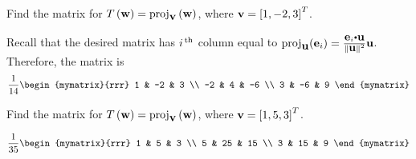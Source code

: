 \begin{enumialphparenastyle}
\begin{ex}
  Find the matrix for
  $T\left(\mbox{\bf w}\right) = \mbox{\rm proj}_{\mbox{\bf v}}\left(\mbox{\bf w}\right)$, where
  $\mbox{\bf v}=\left[1, -2, 3\right]^{T}$.
  \begin{sol}
    Recall that the desired matrix has $i^{\,\rm th}$ column equal to
    $\func{proj}_{\vect{u}}(\vect{e}_{i}) =
    \frac{\vect{e}_i\dotprod\vect{u}}{\norm{\vect{u}}^{2}}\vect{u}$.
    Therefore, the matrix is
    \begin{equation*}
      \frac{1}{14}\begin{mymatrix}{rrr}
        1 & -2 & 3 \\
        -2 & 4 & -6 \\
        3 & -6 & 9
      \end{mymatrix}
    \end{equation*}
  \end{sol}
\end{ex}

\begin{ex}
  Find the matrix for
  $T\left(\mbox{\bf w}\right) = \mbox{\rm proj}_{\mbox{\bf v}}\left(\mbox{\bf w}\right)$, where
  $\mbox{\bf v}=\left[1,5,3\right]^{T}$.
  \begin{sol}
    \begin{equation*}
      \frac{1}{35}\begin{mymatrix}{rrr}
        1 & 5 & 3 \\
        5 & 25 & 15 \\
        3 & 15 & 9
      \end{mymatrix}
    \end{equation*}
  \end{sol}
\end{ex}

\end{enumialphparenastyle}
